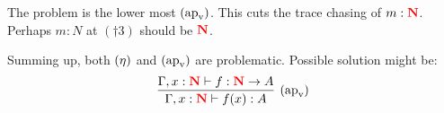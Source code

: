 \documentclass{article}
\newcommand{\bfColor}[2]{{\bf \color{#1}{#2}}}
\newcommand{\Rapv}{\hbox{$(\text{ap}_{\text{v}})$}}
\newcommand{\Reta}{\hbox{$(\eta)$}}
\newcommand{\N}{N}
\newcommand{\rN}{\bfColor{red}{N}}
\begin{document}
The problem is the lower most $\Rapv$.
This cuts the trace chasing of $m:\rN$. 
Perhaps $m:\N$ at $(\dagger3)$ should be $\rN$. 

\vspace{1cm}

Summing up, both $\Reta$ and $\Rapv$ are problematic.
Possible solution might be: 
\[
\infer[\Rapv]{
  \Gamma,x:\rN \vdash f(x):A
}{
  \Gamma,x:\rN \vdash f:\rN\to A
}
\]


  
\end{document}
